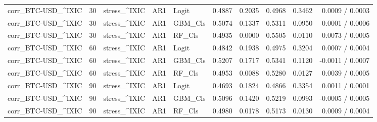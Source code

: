 \begin{table}[H]
\begin{tabular}{lllllrrrrr}
corr_BTC-USD_^IXIC & 30 & stress_^IXIC & AR1 & Logit & 0.4887 & 0.2035 & 0.4968 & 0.3462 & 0.0009 / 0.0003 \\
corr_BTC-USD_^IXIC & 30 & stress_^IXIC & AR1 & GBM_Cls & 0.5074 & 0.1337 & 0.5311 & 0.0950 & 0.0001 / 0.0006 \\
corr_BTC-USD_^IXIC & 30 & stress_^IXIC & AR1 & RF_Cls & 0.4935 & 0.0000 & 0.5505 & 0.0110 & 0.0073 / 0.0005 \\
corr_BTC-USD_^IXIC & 60 & stress_^IXIC & AR1 & Logit & 0.4842 & 0.1938 & 0.4975 & 0.3204 & 0.0007 / 0.0004 \\
corr_BTC-USD_^IXIC & 60 & stress_^IXIC & AR1 & GBM_Cls & 0.5207 & 0.1717 & 0.5341 & 0.1120 & -0.0011 / 0.0007 \\
corr_BTC-USD_^IXIC & 60 & stress_^IXIC & AR1 & RF_Cls & 0.4953 & 0.0088 & 0.5280 & 0.0127 & 0.0039 / 0.0005 \\
corr_BTC-USD_^IXIC & 90 & stress_^IXIC & AR1 & Logit & 0.4693 & 0.1824 & 0.4866 & 0.3354 & 0.0011 / 0.0001 \\
corr_BTC-USD_^IXIC & 90 & stress_^IXIC & AR1 & GBM_Cls & 0.5096 & 0.1420 & 0.5219 & 0.0993 & -0.0005 / 0.0005 \\
corr_BTC-USD_^IXIC & 90 & stress_^IXIC & AR1 & RF_Cls & 0.4980 & 0.0178 & 0.5173 & 0.0130 & 0.0009 / 0.0004 \\
\bottomrule
\end{tabular}
\end{table}